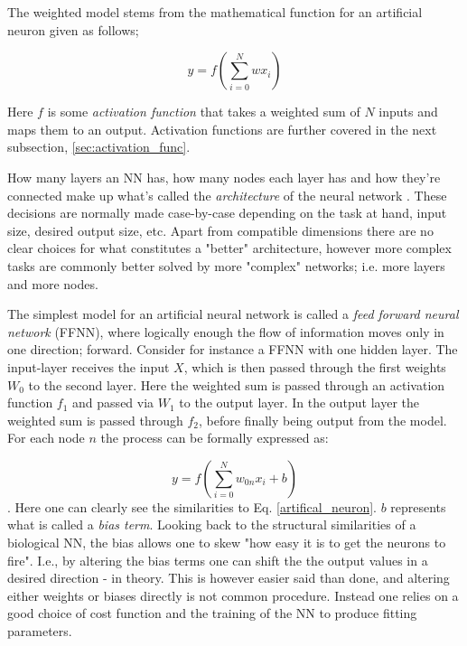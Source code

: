 The weighted model stems from the mathematical function for an artificial neuron given as follows; 

\begin{equation}\label{artifical_neuron}
    y = f\left( \sum_{i=0}^Nwx_i \right) 
\end{equation}

Here $f$ is some \textit{activation function} that takes a weighted sum of $N$ inputs and maps them to an output. Activation functions are further covered in the next subsection, \ref{sec:activation_func}.

How many layers an NN has, how many nodes each layer has and how they're connected make up what's called the \textit{architecture} of the neural network \citep[Ch.1]{nielsen}. These decisions are normally made case-by-case depending on the task at hand, input size, desired output size, etc. Apart from compatible dimensions there are no clear choices for what constitutes a "better" architecture, however more complex tasks are commonly better solved by more "complex" networks; i.e. more layers and more nodes. 

The simplest model for an artificial neural network is called a \textit{feed forward neural network} (FFNN), where logically enough the flow of information moves only in one direction; forward. Consider for instance a FFNN with one hidden layer. The input-layer receives the input $X$, which is then passed through the first weights $W_0$ to the second layer. Here the weighted sum is passed through an activation function $f_1$ and passed via $W_1$ to the output layer. In the output layer the weighted sum is passed through $f_2$, before finally being output from the model. 
For each node $n$ the process can be formally expressed as:


\begin{equation}
    y = f\left( \sum_{i=0}^N w_{0n}x_i + b\right)
\end{equation}
\citep[p.17]{Ketkar2017}. Here one can clearly see the similarities to Eq. \ref{artifical_neuron}. $b$ represents what is called a \textit{bias term}. Looking back to the structural similarities of a biological NN, the bias allows one to skew "how easy it is to get the neurons to fire". I.e., by altering the bias terms one can shift the the output values in a desired direction - in theory. This is however easier said than done, and altering either weights or biases directly is not common procedure. Instead one relies on a good choice of cost function and the training of the NN to produce fitting parameters. 


